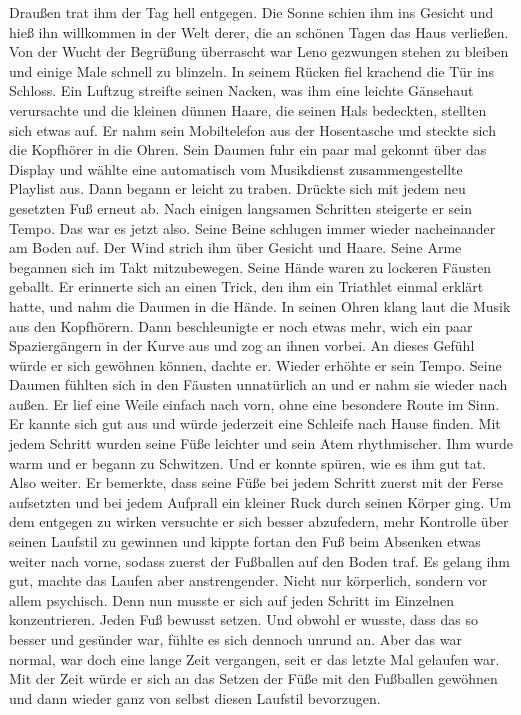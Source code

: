 \documentclass[ngerman,smalldemyvopaper,11pt,oneside,onecolumn,openright,extrafontsizes]{memoir}
\begin{document}
Draußen trat ihm der Tag hell entgegen. Die Sonne schien ihm ins Gesicht und hieß ihn willkommen in der Welt derer, die an schönen Tagen das Haus verließen. Von der Wucht der Begrüßung überrascht war Leno gezwungen stehen zu bleiben und einige Male schnell zu blinzeln. In seinem Rücken fiel krachend die Tür ins Schloss. Ein Luftzug streifte seinen Nacken, was ihm eine leichte Gänsehaut verursachte und die kleinen dünnen Haare, die seinen Hals bedeckten, stellten sich etwas auf. Er nahm sein Mobiltelefon aus der Hosentasche und steckte sich die Kopfhörer in die Ohren. Sein Daumen fuhr ein paar mal gekonnt über das Display und wählte eine automatisch vom Musikdienst zusammengestellte Playlist aus. Dann begann er leicht zu traben. Drückte sich mit jedem neu gesetzten Fuß erneut ab. Nach einigen langsamen Schritten steigerte er sein Tempo. Das war es jetzt also. Seine Beine schlugen immer wieder nacheinander am Boden auf. Der Wind strich ihm über Gesicht und Haare. Seine Arme begannen sich im Takt mitzubewegen. Seine Hände waren zu lockeren Fäusten geballt. Er erinnerte sich an einen Trick, den ihm ein Triathlet einmal erklärt hatte, und nahm die Daumen in die Hände. In seinen Ohren klang laut die Musik aus den Kopfhörern. Dann beschleunigte er noch etwas mehr, wich ein paar Spaziergängern in der Kurve aus und zog an ihnen vorbei. An dieses Gefühl würde er sich gewöhnen können, dachte er. Wieder erhöhte er sein Tempo. Seine Daumen fühlten sich in den Fäusten unnatürlich an und er nahm sie wieder nach außen. Er lief eine Weile einfach nach vorn, ohne eine besondere Route im Sinn. Er kannte sich gut aus und würde jederzeit eine Schleife nach Hause finden. Mit jedem Schritt wurden seine Füße leichter und sein Atem rhythmischer. Ihm wurde warm und er begann zu Schwitzen. Und er konnte spüren, wie es ihm gut tat. Also weiter. Er bemerkte, dass seine Füße bei jedem Schritt zuerst mit der Ferse aufsetzten und bei jedem Aufprall ein kleiner Ruck durch seinen Körper ging. Um dem entgegen zu wirken versuchte er sich besser abzufedern, mehr Kontrolle über seinen Laufstil zu gewinnen und kippte fortan den Fuß beim Absenken etwas weiter nach vorne, sodass zuerst der Fußballen auf den Boden traf. Es gelang ihm gut, machte das Laufen aber anstrengender. Nicht nur körperlich, sondern vor allem psychisch. Denn nun musste er sich auf jeden Schritt im Einzelnen konzentrieren. Jeden Fuß bewusst setzen. Und obwohl er wusste, dass das so besser und gesünder war, fühlte es sich dennoch unrund an. Aber das war normal, war doch eine lange Zeit vergangen, seit er das letzte Mal gelaufen war. Mit der Zeit würde er sich an das Setzen der Füße mit den Fußballen gewöhnen und dann wieder ganz von selbst diesen Laufstil bevorzugen.\\
\end{document}
